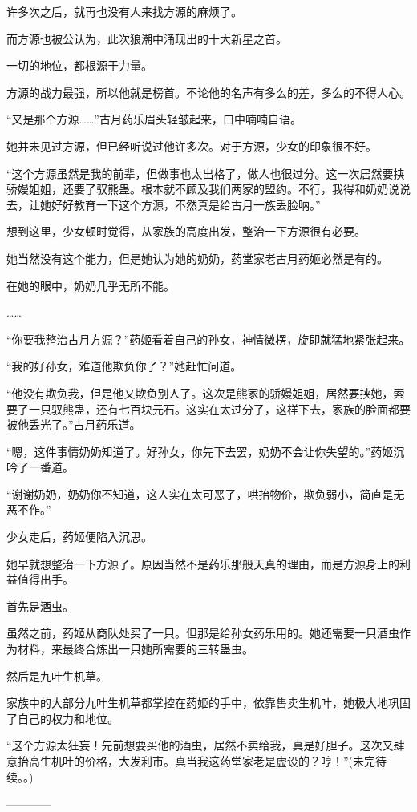 \begin{this_body}
许多次之后，就再也没有人来找方源的麻烦了。

而方源也被公认为，此次狼潮中涌现出的十大新星之首。

一切的地位，都根源于力量。

方源的战力最强，所以他就是榜首。不论他的名声有多么的差，多么的不得人心。

“又是那个方源……”古月药乐眉头轻皱起来，口中喃喃自语。

她并未见过方源，但已经听说过他许多次。对于方源，少女的印象很不好。

“这个方源虽然是我的前辈，但做事也太出格了，做人也很过分。这一次居然要挟骄嫚姐姐，还要了驭熊蛊。根本就不顾及我们两家的盟约。不行，我得和奶奶说说去，让她好好教育一下这个方源，不然真是给古月一族丢脸呐。”

想到这里，少女顿时觉得，从家族的高度出发，整治一下方源很有必要。

她当然没有这个能力，但是她认为她的奶奶，药堂家老古月药姬必然是有的。

在她的眼中，奶奶几乎无所不能。

……

“你要我整治古月方源？”药姬看着自己的孙女，神情微楞，旋即就猛地紧张起来。

“我的好孙女，难道他欺负你了？”她赶忙问道。

“他没有欺负我，但是他又欺负别人了。这次是熊家的骄嫚姐姐，居然要挟她，索要了一只驭熊蛊，还有七百块元石。这实在太过分了，这样下去，家族的脸面都要被他丢光了。”古月药乐道。

“嗯，这件事情奶奶知道了。好孙女，你先下去罢，奶奶不会让你失望的。”药姬沉吟了一番道。

“谢谢奶奶，奶奶你不知道，这人实在太可恶了，哄抬物价，欺负弱小，简直是无恶不作。”

少女走后，药姬便陷入沉思。

她早就想整治一下方源了。原因当然不是药乐那般天真的理由，而是方源身上的利益值得出手。

首先是酒虫。

虽然之前，药姬从商队处买了一只。但那是给孙女药乐用的。她还需要一只酒虫作为材料，来最终合炼出一只她所需要的三转蛊虫。

然后是九叶生机草。

家族中的大部分九叶生机草都掌控在药姬的手中，依靠售卖生机叶，她极大地巩固了自己的权力和地位。

“这个方源太狂妄！先前想要买他的酒虫，居然不卖给我，真是好胆子。这次又肆意抬高生机叶的价格，大发利市。真当我这药堂家老是虚设的？哼！”(未完待续。。)

------------

\end{this_body}

